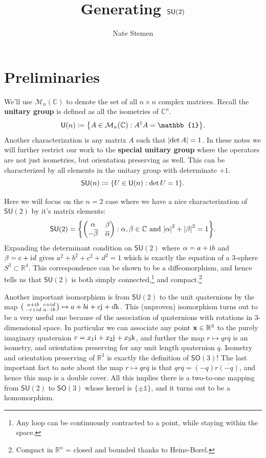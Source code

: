 \documentclass[12pt,dvipsnames]{article}
\title{Generating $\SU{2}$}
\author{Nate Stemen}
\newcommand{\U}[1]{\mathsf{U} (#1)}
\newcommand{\SU}[1]{\mathsf{SU} (#1)}
\newcommand{\SO}[1]{\mathsf{SO} (#1)}
\newcommand{\mats}[2]{\mathcal{M}_{#1} (#2)}
\newcommand{\C}{\mathbb{C}}
\newcommand{\R}{\mathbb{R}}
\newcommand{\1}{\mathbb{1}}
\newcommand{\iu}{\mathrm{i}\mkern1mu}
\newcommand{\ju}{\mathrm{j}\mkern1mu}
\newcommand{\ku}{\mathrm{k}\mkern1mu}
\theoremstyle{plain}
\begin{document}
\maketitle

\section{Preliminaries}

We'll use $\mats{n}{\C}$ to denote the set of all $n\times n$ complex matrices.
Recall the \textbf{unitary group} is defined as all the isometries of $\C^n$.
\begin{equation}
    \U{n} \coloneqq \qty{A\in\mats{n}{\C}: A^\dagger A = \1 }.
\end{equation}
Another characterization is any matrix $A$ such that $\abs{\det A} = 1$.
In these notes we will further restrict our work to the \textbf{special unitary group} where the operators are not just isometries, but orientation preserving as well.
This can be characterized by all elements in the unitary group with determinate $+1$.
\begin{equation}
    \SU{n}\coloneqq \qty{U\in\U{n}: \det U = 1}.
\end{equation}

Here we will focus on the $n = 2$ case where we have a nice characterization of $\SU{2}$ by it's matrix elements:
\begin{equation}
    \SU{2} = \qty{\mqty(\alpha & \beta \\ -\overline{\beta} & \overline{\alpha}) : \alpha, \beta \in \C\text{ and } \abs{\alpha}^2 + \abs{\beta}^2 = 1}.
\end{equation}
Expanding the determinant condition on $\SU{2}$ where $\alpha = a + \iu b$ and $\beta = c + \iu d$ gives $a^2 + b^2 + c^2 + d^2 = 1$ which is exactly the equation of a 3-sphere $S^3\subset\R^4$. This correspondence can be shown to be a diffeomorphism, and hence tells us that $\SU{2}$ is both simply connected,\footnote{Any loop can be continuously contracted to a point, while staying within the space.} and compact.\footnote{Compact in $\R^n$ = closed and bounded thanks to Heine-Borel.}

Another important isomorphism is from $\SU{2}$ to the unit quaternions by the map $\smqty(a + \iu b & c + \iu d \\ -c + \iu d & a - \iu b)\mapsto a + b\iu + c\ju + d\ku$. This (unproven) isomorphism turns out to be a very useful one because of the association of quaternions with rotations in 3-dimensional space. In particular we can associate any point $\vb{x}\in\R^3$ to the purely imaginary quaternion $r = x_1\iu + x_2\ju + x_3\ku$, and further the map $r\mapsto qr\overline{q}$ is an isometry, and orientation preserving for any unit length quaternion $q$. Isometry and orientation preserving of $\R^3$ is exactly the definition of $\SO{3}$! The last important fact to note about the map $r\mapsto qr\overline{q}$ is that $qr\overline{q} = (-q)r\overline{(-q)}$, and hence this map is a double cover. All this implies there is a two-to-one mapping from $\SU{2}$ to $\SO{3}$ whose kernel is $\{\pm \1 \}$, and it turns out to be a homomorphism.
\end{document}
